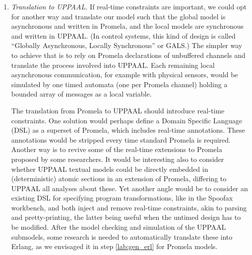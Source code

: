 \documentclass[a4paper,11pt,twoside]{article}
\newcommand\Promela{\textsf{Promela}\xspace}
\newcommand\UPPAAL{\textsf{UPPAAL}\xspace}
\newcommand\Erlang{\textsf{Erlang}\xspace}
\newcommand\Spoofax{\textsf{Spoofax}\xspace}
\begin{document}
\begin{enumerate}
\begin{enumerate}
\begin{enumerate}
          \item \emph{Translation to \UPPAAL.} If real\hyp{}time
            constraints are important, we could opt for another way
            and translate our model such that the global model is
            asynchronous and written in \Promela, and the local models
            are synchronous and written in \UPPAAL. (In control
            systems, this kind of design is called ``Globally
            Asynchronous, Locally Synchronous'' or GALS.) The simpler
            way to achieve that is to rely on \Promela declarations of
            unbuffered channels and translate the process involved
            into \UPPAAL. Each remaining local asynchronous
            communication, for example with physical sensors, would be
            simulated by one timed automata (one per \Promela channel)
            holding a bounded array of messages as a local variable.

           The translation from \Promela to \UPPAAL should introduce
           real\hyp{}time constraints. One solution would perhaps
           define a Domain Specific Language (DSL) as a superset of
           \Promela, which includes real\hyp{}time annotations. These
           annotations would be stripped every time standard \Promela
           is required. Another way is to revive some of the
           real\hyp{}time extensions to \Promela proposed by some
           researchers. It would be interesting also to consider
           whether \UPPAAL textual models could be directly embedded
           in (deterministic) atomic sections in an extension of
           \Promela, differing to \UPPAAL all analyses about
           these. Yet another angle would be to consider an existing
           DSL for specifying program transformations, like in the
           \Spoofax workbench, and both inject and remove
           real\hyp{}time constraints, akin to parsing and
           pretty\hyp{}printing, the latter being useful when the
           untimed design has to be modified. After the model checking
           and simulation of the \UPPAAL submodels, some research is
           needed to automatically translate these into \Erlang, as we
           envisaged it in step \ref{lab:gen_erl} for \Promela models.

        \end{enumerate}

    \end{enumerate}

\end{enumerate}
\end{document}
